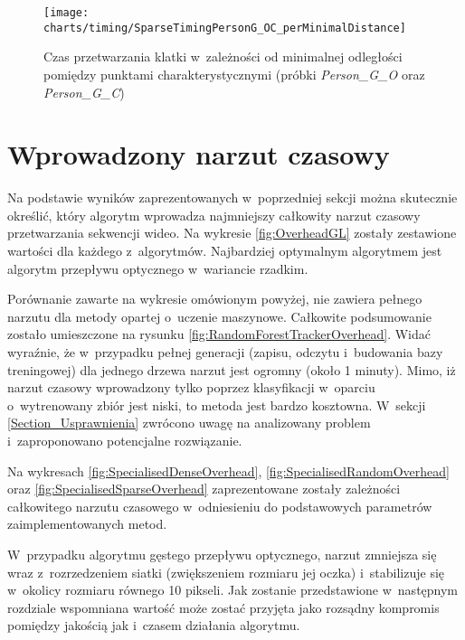       \begin{figure}[!ht]
        \centering
        \texttt{[image: charts/timing/SparseTimingPersonG\_OC\_perMinimalDistance]}
        \caption[Czas przetwarzania klatki w~zależności od minimalnej odległości pomiędzy punktami charakterystycznymi]
                {Czas przetwarzania klatki w~zależności od minimalnej odległości pomiędzy punktami charakterystycznymi (próbki \textit{Person\_G\_O} oraz \textit{Person\_G\_C})}
        \label{fig:TimingPerMinimalDistance}
      \end{figure}

  \section{Wprowadzony narzut czasowy}\label{Section_Overhead}
    Na podstawie wyników zaprezentowanych w~poprzedniej sekcji można skutecznie określić, który algorytm wprowadza najmniejszy całkowity narzut czasowy przetwarzania sekwencji wideo. Na wykresie \ref{fig:OverheadGL} zostały zestawione wartości dla każdego z~algorytmów. Najbardziej optymalnym algorytmem jest algorytm przepływu optycznego w~wariancie rzadkim.

    Porównanie zawarte na wykresie omówionym powyżej, nie zawiera pełnego narzutu dla metody opartej o~uczenie maszynowe. Całkowite podsumowanie zostało umieszczone na rysunku \ref{fig:RandomForestTrackerOverhead}. Widać wyraźnie, że w~przypadku pełnej generacji (zapisu, odczytu i~budowania bazy treningowej) dla jednego drzewa narzut jest ogromny (około 1 minuty). Mimo, iż narzut czasowy wprowadzony tylko poprzez klasyfikacji w~oparciu o~wytrenowany zbiór jest niski, to metoda jest bardzo kosztowna. W~sekcji \ref{Section_Usprawnienia} zwrócono uwagę na analizowany problem i~zaproponowano potencjalne rozwiązanie.

    Na wykresach \ref{fig:SpecialisedDenseOverhead}, \ref{fig:SpecialisedRandomOverhead} oraz \ref{fig:SpecialisedSparseOverhead} zaprezentowane zostały zależności całkowitego narzutu czasowego w~odniesieniu do podstawowych parametrów zaimplementowanych metod.

    W~przypadku algorytmu gęstego przepływu optycznego, narzut zmniejsza się wraz z~rozrzedzeniem siatki (zwiększeniem rozmiaru jej oczka) i~stabilizuje się w~okolicy rozmiaru równego 10 pikseli. Jak zostanie przedstawione w~następnym rozdziale wspomniana wartość może zostać przyjęta jako rozsądny kompromis pomiędzy jakością jak i~czasem działania algorytmu.

